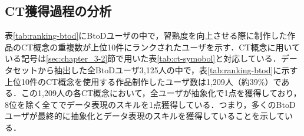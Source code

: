 \documentclass[11pt,dvipdfmx]{jreport}
\begin{document}
\subsection{CT獲得過程の分析}\label{subsec:ct-analysis}

表\ref{tab:ranking-btod}にBtoDユーザの中で，習熟度を向上させる際に制作した作品のCT概念の重複数が上位10件にランクされたユーザを示す．CT概念に用いている記号は\ref{sec:chapter_3-2}節で用いた表\ref{tab:ct-symobol}と対応している．データセットから抽出した全BtoDユーザ3,125人の中で，表\ref{tab:ranking-btod}に示す上位10件のCT概念を使用する作品制作したユーザ数は1,209人（約39\%）である．この1,209人の各CT概念において，全ユーザが抽象化で1点を獲得しており，8位を除く全てでデータ表現のスキルを1点獲得している．つまり，多くのBtoDユーザが最終的に抽象化とデータ表現のスキルを獲得していることを示している．
\end{document}

